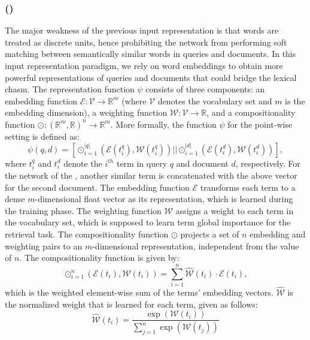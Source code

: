 \subsubsection{\label{sec:feedthree}\Feedthree (\fthree)}
The major weakness of the previous input representation is that words are treated as discrete units, hence prohibiting the network from performing soft matching between semantically similar words in queries and documents. In this input representation paradigm, we rely on word embeddings to obtain more powerful representations of queries and documents that could bridge the lexical chasm. %
The representation function $\psi$ consists of three components: an embedding function $\mathcal{E}: \mathcal{V} \rightarrow \mathbb{R}^{m}$ (where $\mathcal{V}$ denotes the vocabulary set and $m$ is the embedding dimension), a weighting function $\mathcal{W}: \mathcal{V} \rightarrow \mathbb{R}$, and a compositionality function $\odot: (\mathbb{R}^{m}, \mathbb{R})^n \rightarrow \mathbb{R}^{m}$. More formally, the function $\psi$ for the point-wise setting is defined as:
\begin{equation}
\psi(q, d) = [\odot_{i=1}^{|q|}(\mathcal{E}(t_i^q), \mathcal{W}(t_i^q)) || \odot_{i=1}^{|d|} (\mathcal{E}(t_i^d), \mathcal{W}(t_i^d))],
\end{equation}
where $t_i^q$ and $t_i^d$ denote the $i^{th}$ term in query $q$ and document $d$, respectively. 
For the network of the \modelthree, another similar term is concatenated with the above vector for the second document. The embedding function $\mathcal{E}$ transforms each term to a dense $m$-dimensional float vector as its representation, which is learned during the training phase. The weighting function $\mathcal{W}$ assigns a weight to each term in the vocabulary set, which is supposed to learn term global importance for the retrieval task. The compositionality function $\odot$ projects a set of $n$ embedding and weighting pairs to an $m$-dimensional representation, independent from the value of $n$. The compositionality function is given by:
\begin{equation}
\odot_{i=1}^n(\mathcal{E}(t_i), \mathcal{W}(t_i)) = \sum_{i=1}^n \widehat{\mathcal{W}}(t_i)\cdot \mathcal{E}(t_i),
\end{equation}
which is the weighted element-wise sum of the terms' embedding vectors. $\widehat{\mathcal{W}}$ is the normalized weight that is learned for each term, given as follows:
\begin{equation}
\widehat{\mathcal{W}}(t_i) = \frac{\exp(\mathcal{W}(t_i))}{\sum_{j=1}^n{ \exp(\mathcal{W}(t_j))}}
\end{equation}

